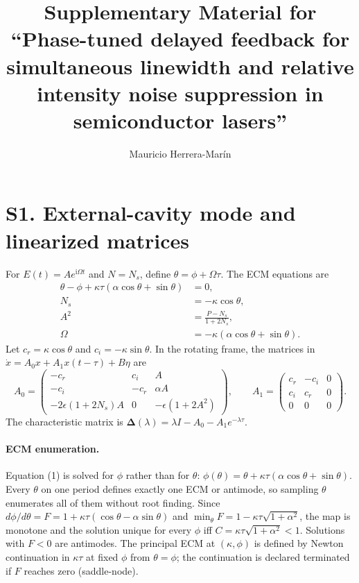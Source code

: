 \documentclass[11pt]{article}
\title{Supplementary Material for\\``Phase-tuned delayed feedback for simultaneous linewidth and relative intensity noise suppression in semiconductor lasers''}
\author{Mauricio Herrera-Mar\'in}
\date{}
\newcommand{\ii}{\mathrm{i}}
\newcommand{\Dmat}{\bm{\Delta}}
\newif\ifmarked
\newenvironment{revised}{\ifmarked\color{blue}\fi}{}
\begin{document}
\maketitle

\section*{S1. External-cavity mode and linearized matrices}

For $E(t)=Ae^{\ii\Omega t}$ and $N=N_s$, define $\theta=\phi+\Omega\tau$. The ECM equations are
\begin{align}
\theta-\phi+\kappa\tau(\alpha\cos\theta+\sin\theta)&=0,\\
N_s&=-\kappa\cos\theta,\\
A^2&=\frac{P-N_s}{1+2N_s},\\
\Omega&=-\kappa(\alpha\cos\theta+\sin\theta).
\end{align}
Let $c_r=\kappa\cos\theta$ and $c_i=-\kappa\sin\theta$. In the rotating frame, the matrices in
$\dot x=A_0x+A_1x(t-\tau)+B\eta$ are
\begin{equation}
A_0=\begin{pmatrix}
-c_r & c_i & A\\
-c_i & -c_r & \alpha A\\
-2\epsilon(1+2N_s)A & 0 & -\epsilon(1+2A^2)
\end{pmatrix},
\qquad
A_1=\begin{pmatrix}
c_r & -c_i & 0\\
c_i & c_r & 0\\
0&0&0
\end{pmatrix}.
\end{equation}
The characteristic matrix is $\Dmat(\lambda)=\lambda I-A_0-A_1e^{-\lambda\tau}$.

\begin{revised}\paragraph{ECM enumeration.} Equation (1) is solved for $\phi$ rather than for $\theta$: $\phi(\theta)=\theta+\kappa\tau(\alpha\cos\theta+\sin\theta)$. Every $\theta$ on one period defines exactly one ECM or antimode, so sampling $\theta$ enumerates all of them without root finding. Since $d\phi/d\theta=F=1+\kappa\tau(\cos\theta-\alpha\sin\theta)$ and $\min_\theta F=1-\kappa\tau\sqrt{1+\alpha^2}$, the map is monotone and the solution unique for every $\phi$ iff $C=\kappa\tau\sqrt{1+\alpha^2}<1$. Solutions with $F<0$ are antimodes. The principal ECM at $(\kappa,\phi)$ is defined by Newton continuation in $\kappa\tau$ at fixed $\phi$ from $\theta=\phi$; the continuation is declared terminated if $F$ reaches zero (saddle-node).\end{revised}
\end{document}
